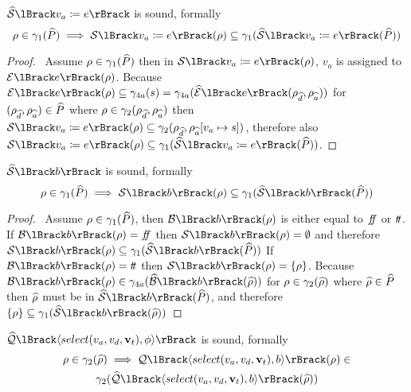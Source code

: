 \begin{conjecture}
    \label{thm:sound-assign}
    $\abssem{v_a \coloneqq e}$ is sound, formally
    \begin{equation*}
    \environment \in \concrete_1(\ab{P}) \implies \sem{v_a \coloneqq e}(\environment) \subseteq \concrete_1(\abssem{v_a \coloneqq e}(\ab{P}))
    \end{equation*}
\end{conjecture}


\begin{proof}
    \pf\
    Assume $\rho \in \gamma_1(\widehat{P})$ then in $\sem{v_a \coloneqq e}(\environment)$, $v_a$ is assigned to $\expsem{e}(\environment)$.
    Because $\expsem{e}(\environment) \subseteq \concrete_{4a}(s) = \concrete_{4a}(\absexpsem{e}(\env{\ab{d}}, \env{\ab{a}}))$ for $(\rho_{\widehat{d}}, \rho_{\widehat{a}}) \in \widehat{P}$ where $\rho \in \gamma_2(\rho_{\widehat{d}}, \rho_{\widehat{a}})$ then $\sem{v_a \coloneqq e}(\environment) \subseteq \concrete_2(\env{\ab{d}}, \env{\ab{a}}[v_a \mapsto s])$, therefore also $\sem{v_a \coloneqq e}(\environment) \subseteq \concrete_1(\abssem{v_a \coloneqq e}(\ab{P}))$.
\end{proof}


\begin{conjecture}
    \label{thm:sound-boolsem}
    $\abssem{b}$ is sound, formally
    \begin{equation*}
    \environment \in \concrete_1(\ab{P}) \implies \sem{b}(\environment) \subseteq \concrete_1(\abssem{b}(\ab{P}))
    \end{equation*}
\end{conjecture}


\begin{proof}
    \pf\
    Assume $\rho \in \gamma_1(\widehat{P})$, then $\boolsem{b}(\environment)$ is either equal to $f\!\!f$ or $t\!t$.
    If $\boolsem{b}(\environment) = \false$ then $\sem{b}(\environment) = \emptyset$ and therefore $\sem{b}(\environment) \subseteq \concrete_1(\abssem{b}(\ab{P}))$
    If $\boolsem{b}(\environment) = \true$ then $\sem{b}(\environment) = \{ \environment \}$.
    Because $\boolsem{b}(\environment) \in \concrete_{4a}(\absboolsem{b}(\ab{\environment}))$ for $\rho \in \gamma_2(\widehat{\rho})$ where $\widehat{\rho} \in \widehat{P}$ then $\widehat{\rho}$ must be in $\abssem{b}(\ab{P})$, and therefore $\{ \environment \} \subseteq \concrete_1(\abssem{b}(\ab{\environment}))$
\end{proof}


\begin{conjecture}
    \label{thm:sound-select}
    $\abssqlsem{\langle select(v_a, v_d, \mathbf{v}_t), \phi \rangle}$ is sound, formally
    \begin{multline*}
        \environment \in \concrete_2(\ab{\environment}) \implies \sqlsem{\langle select(v_a, v_d, \mathbf{v}_t), b \rangle}(\environment) \in \\
        \concrete_2(\abssqlsem{\langle select(v_a, v_d, \mathbf{v}_t), b \rangle}(\ab{\environment}))
    \end{multline*}
\end{conjecture}


